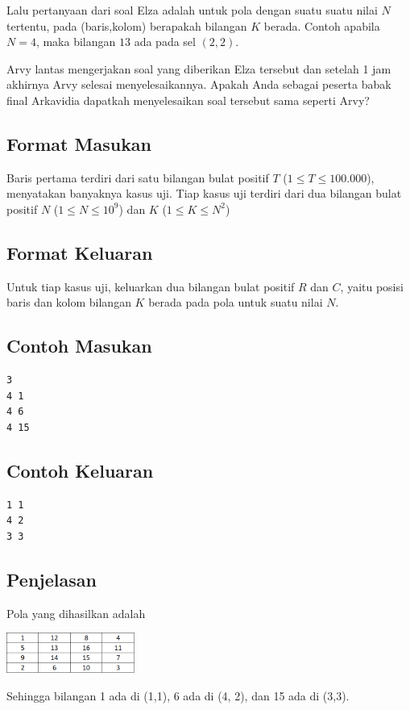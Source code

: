 \documentclass{article}
\begin{document}
Lalu pertanyaan dari soal Elza adalah untuk pola dengan suatu suatu nilai $N$ tertentu, pada (baris,kolom) berapakah bilangan 
$K$ berada. Contoh apabila $N = 4$, maka bilangan $13$ ada pada sel $(2, 2)$. 

Arvy lantas mengerjakan soal yang diberikan Elza tersebut dan setelah 1 jam akhirnya Arvy selesai menyelesaikannya.
Apakah Anda sebagai peserta babak final Arkavidia dapatkah menyelesaikan soal tersebut sama seperti Arvy?

\subsection*{Format Masukan}

Baris pertama terdiri dari satu bilangan bulat positif $T$ ($1 \leq T \leq 100.000$), menyatakan banyaknya kasus uji.
Tiap kasus uji terdiri dari dua bilangan bulat positif $N$ ($1 \leq N \leq 10^{9}$) dan $K$ ($1 \leq K \leq N^2$)

\subsection*{Format Keluaran}

Untuk tiap kasus uji, keluarkan dua bilangan bulat positif $R$ dan $C$, yaitu posisi baris dan kolom bilangan $K$ berada pada 
pola untuk suatu nilai $N$.

\pagebreak

\begin{multicols}{2}
\subsection*{Contoh Masukan}
\begin{lstlisting}
3
4 1
4 6
4 15
\end{lstlisting}
\columnbreak
\subsection*{Contoh Keluaran}
\begin{lstlisting}
1 1
4 2
3 3
\end{lstlisting}
\vfill
\null
\end{multicols}

\subsection*{Penjelasan}
Pola yang dihasilkan adalah
\begin{center}
    \includegraphics[height=50px]{n=4.PNG}
\end{center}
Sehingga bilangan 1 ada di (1,1), 6 ada di (4, 2), dan 15 ada di (3,3).

\pagebreak
\end{document}
